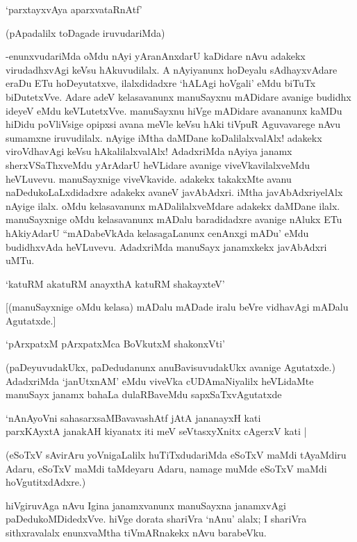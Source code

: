 \begin{shloka}
`parxtayxvAya aparxvataRnAtf'
\end{shloka}

(pApadalilx toDagade iruvudariMda)

-enunxvudariMda oMdu nAyi yAranAnxdarU kaDidare nAvu adakekx virudadhxvAgi keVsu hAkuvudilalx. A nAyiyanunx hoDeyalu sAdhayxvAdare eraDu ETu hoDeyutatxve, ilalxdidadxre `hALAgi hoVgali' eMdu biTuTx biDutetxVve. Adare adeV kelasavanunx manuSayxnu mADidare avanige budidhx ideyeV eMdu keVLutetxVve. manuSayxnu hiVge mADidare avananunx kaMDu hiDidu poVliVsige opipxsi avana meVle keVsu hAki tiVpuR Aguvavarege nAvu sumamxne iruvudilalx. nAyige iMtha daMDane koDalilalxvalAlx! adakekx viroVdhavAgi keVsu hAkalilalxvalAlx! AdadxriMda nAyiya janamx sherxVSaThxveMdu yArAdarU heVLidare avanige viveVkavilalxveMdu heVLuvevu. manuSayxnige viveVkavide. adakekx takakxMte avanu naDedukoLaLxdidadxre adakekx avaneV javAbAdxri. iMtha javAbAdxriyelAlx nAyige ilalx. oMdu kelasavanunx mADalilalxveMdare adakekx daMDane ilalx. manuSayxnige oMdu kelasavanunx mADalu baradidadxre avanige nAlukx ETu hAkiyAdarU ``mADabeVkAda kelasagaLanunx cenAnxgi mADu' eMdu budidhxvAda heVLuvevu. AdadxriMda manuSayx janamxkekx javAbAdxri uMTu.

\begin{shloka}
`katuRM akatuRM anayxthA katuRM shakayxteV'
\end{shloka}

[(manuSayxnige oMdu kelasa) mADalu mADade iralu beVre vidhavAgi mADalu Agutatxde.]

\begin{shloka}
`pArxpatxM pArxpatxMca BoVkutxM shakonxVti'
\end{shloka}

(paDeyuvudakUkx, paDedudanunx anuBavisuvudakUkx avanige Agutatxde.) AdadxriMda `janUtxnAM' eMdu viveVka cUDAmaNiyalilx heVLidaMte manuSayx janamx bahaLa dulaRBaveMdu sapxSaTxvAgutatxde

\begin{shloka}
`nAnAyoVni sahasarxsaMBavavashAtf jAtA jananayxH kati\\
parxKAyxtA janakAH kiyanatx iti meV seVtasxyXnitx cAgerxV kati |
\end{shloka}

(eSoTxV sAvirAru yoVnigaLalilx huTiTxdudariMda eSoTxV maMdi tAyaMdiru Adaru, eSoTxV maMdi taMdeyaru Adaru, namage muMde eSoTxV maMdi hoVgutitxdAdxre.)

hiVgiruvAga nAvu Igina janamxvanunx manuSayxna janamxvAgi paDedukoMDidedxVve. hiVge dorata shariVra `nAnu' alalx; I shariVra sithxravalalx enunxvaMtha tiVmARnakekx nAvu barabeVku.

